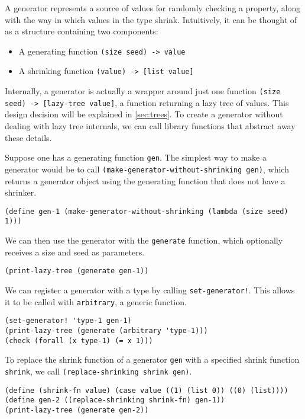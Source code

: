 \documentclass{scrartcl}
\begin{document}
A generator represents a source of values for randomly checking a property,
along with the way in which values in the type shrink.
Intuitively, it can be thought of as a structure containing two components:
\begin{itemize}
\item A generating function \verb|(size seed) -> value|
\item A shrinking function \verb|(value) -> [list value]|
\end{itemize}
Internally, a generator is actually a wrapper around just one function
\verb|(size seed) -> [lazy-tree value]|, a function returning a lazy tree of
values. This design decision will be explained in
\cref{sec:trees}.
To create a generator without dealing with lazy tree internals,
we can call library functions that abstract away these details.

Suppose one has a generating function \verb|gen|. The simplest way to make a
generator would be to call \verb|(make-generator-without-shrinking gen)|,
which returns a generator object using the generating function that does not
have a shrinker.
\begin{verbatim}
(define gen-1 (make-generator-without-shrinking (lambda (size seed) 1)))
\end{verbatim}

We can then use the generator with the \verb|generate| function,
which optionally receives a size and seed as parameters.
\begin{verbatim}
(print-lazy-tree (generate gen-1))
\end{verbatim}

We can register a generator with a type by calling \verb|set-generator!|. This
allows it to be called with \verb|arbitrary|, a generic function.

\begin{verbatim}
(set-generator! 'type-1 gen-1)
(print-lazy-tree (generate (arbitrary 'type-1)))
(check (forall (x type-1) (= x 1)))
\end{verbatim}

To replace the shrink function of a generator \verb|gen| with a specified shrink
function \verb|shrink|, we call \verb|(replace-shrinking shrink gen)|.

\begin{verbatim}
(define (shrink-fn value) (case value ((1) (list 0)) ((0) (list))))
(define gen-2 ((replace-shrinking shrink-fn) gen-1))
(print-lazy-tree (generate gen-2))
\end{verbatim}
\end{document}
